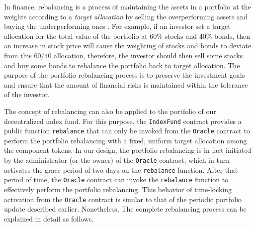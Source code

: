 In finance, rebalancing is a process of maintaining the assets in a portfolio at the weights according to a \textit{target allocation} by selling the overperforming assets and buying the underperforming ones \cite{portfoliorebalancing}. For example, if an investor set a target allocation for the total value of the portfolio at 60\% stocks and 40\% bonds, then an increase in stock price will cause the weighting of stocks and bonds to deviate from this 60/40 allocation, therefore, the investor should then sell some stocks and buy some bonds to rebalance the portfolio back to target allocation. The purpose of the portfolio rebalancing process is to preserve the investment goals and ensure that the amount of financial risks is maintained within the tolerance of the investor. 

The concept of rebalancing can also be applied to the portfolio of our decentralized index fund. For this purpose, the \texttt{IndexFund} contract provides a public function \texttt{rebalance} that can only be invoked from the \texttt{Oracle} contract to perform the portfolio rebalancing with a fixed, uniform target allocation among the component tokens. 
In our design, the portfolio rebalancing is in fact initiated by the administrator (or the owner) of the \texttt{Oracle} contract, which in turn activates the grace period of two days on the \texttt{rebalance} function. After that period of time, the \texttt{Oracle} contract can invoke the \texttt{rebalance} function to effectively perform the portfolio rebalancing. This behavior of time-locking activation from the \texttt{Oracle} contract is similar to that of the periodic portfolio update described earlier. Nonetheless, The complete rebalancing process can be explained in detail as follows.



